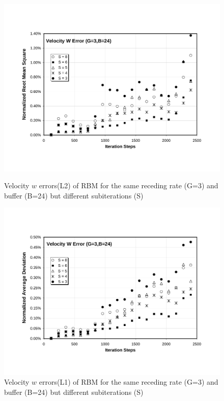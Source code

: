 \cp

\begin{figure}[htbp]
  \begin{center}
\includegraphics[scale=0.6]{../figures/Exp3-CASE1-dt0.005/G_3_B_24/G3-B24-W-NRMS.pdf}
    \caption{Velocity $w$ errors(L2) of RBM for the same receding rate (G=3) and buffer (B=24) but different subiterations (S)}
    \vspace{0.5in}
\includegraphics[scale=0.6]{../figures/Exp3-CASE1-dt0.005/G_3_B_24/G3-B24-W-NAD.pdf}
    \caption{Velocity $w$ errors(L1) of RBM for the same receding rate (G=3) and buffer (B=24) but different subiterations (S)}
  \end{center}
\end{figure}


